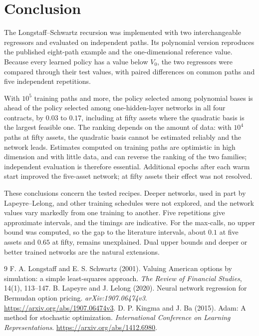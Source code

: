 \documentclass[11pt,a4paper]{article}
\begin{document}
\section{Conclusion}
The Longstaff--Schwartz recursion was implemented with two interchangeable regressors
and evaluated on independent paths. Its polynomial version reproduces the published
eight-path example and the one-dimensional reference value. Because every learned policy
has a value below $V_0$, the two regressors were compared through their test values,
with paired differences on common paths and five independent repetitions.

With $10^5$ training paths and more, the policy selected among polynomial bases is ahead
of the policy selected among one-hidden-layer networks in all four contracts, by $0.03$
to $0.17$, including at fifty assets where the quadratic basis is the largest feasible
one. The ranking depends on the amount of data: with $10^4$ paths at fifty assets, the
quadratic basis cannot be estimated reliably and the network leads. Estimates computed
on training paths are optimistic in high dimension and with little data, and can reverse
the ranking of the two families; independent evaluation is therefore essential.
Additional epochs after each warm start improved the five-asset network; at fifty assets
their effect was not resolved.

These conclusions concern the tested recipes. Deeper networks, used in part by
Lapeyre--Lelong, and other training schedules were not explored, and the network values
vary markedly from one training to another. Five repetitions give approximate intervals,
and the timings are indicative. For the max-calls, no upper bound
was computed, so the gap to the literature intervals, about $0.1$ at five assets and
$0.65$ at fifty, remains unexplained. Dual upper bounds and deeper or better trained
networks are the natural extensions.


\clearpage
{}
{}
\begin{thebibliography}{9}
 F. A. Longstaff and E. S. Schwartz (2001).
Valuing American options by simulation: a simple least-squares approach.
\emph{The Review of Financial Studies}, 14(1), 113--147.
 B. Lapeyre and J. Lelong (2020).
Neural network regression for Bermudan option pricing.
\emph{arXiv:1907.06474v3}. \url{https://arxiv.org/abs/1907.06474v3}.
 D. P. Kingma and J. Ba (2015).
Adam: A method for stochastic optimization.
\emph{International Conference on Learning Representations}.
\url{https://arxiv.org/abs/1412.6980}.
\end{thebibliography}
\end{document}
